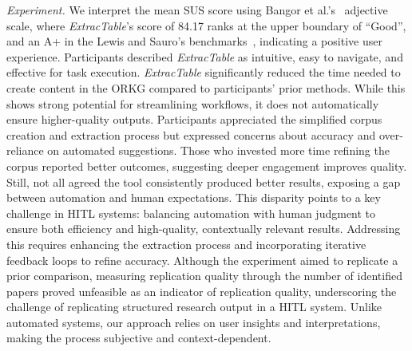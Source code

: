 \documentclass[runningheads]{llncs}
\begin{document}
\noindent
\textit{Experiment.} We interpret the mean SUS score using Bangor et al.'s~\cite{bangor_determining_2009} adjective scale, where \textit{ExtracTable}'s score of 84.17 ranks at the upper boundary of ``Good'', and an A+ in the Lewis and Sauro's benchmarks~\cite{lewis_item_2018}, indicating a positive user experience. Participants described \textit{ExtracTable} as intuitive, easy to navigate, and effective for task execution.
\textit{ExtracTable} significantly reduced the time needed to create content in the ORKG compared to participants' prior methods. 
While this shows strong potential for streamlining workflows, it does not automatically ensure higher-quality outputs.
Participants appreciated the simplified corpus creation and extraction process but expressed concerns about accuracy and over-reliance on automated suggestions.
Those who invested more time refining the corpus reported better outcomes, suggesting deeper engagement improves quality.
Still, not all agreed the tool consistently produced better results, exposing a gap between automation and human expectations. 
This disparity points to a key challenge in HITL systems: balancing automation with human judgment to ensure both efficiency and high-quality, contextually relevant results.
Addressing this requires enhancing the extraction process and incorporating iterative feedback loops to refine accuracy.
Although the experiment aimed to replicate a prior comparison, measuring replication quality through the number of identified papers proved unfeasible as an indicator of replication quality, underscoring the challenge of replicating structured research output in a HITL system.
Unlike automated systems, our approach relies on user insights and interpretations, making the process subjective and context-dependent.\vspace{0.2cm} 
\end{document}
